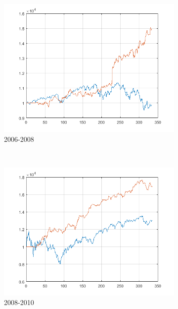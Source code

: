 \documentclass[11pt,a4,twosided,singlespacing,titlepagenumber=on]{scrreprt}
\numberwithin{equation}{chapter} %
\theoremstyle{remark}
\begin{document}
\begin{figure}[H]
\begin{subfigure}[t]{0.32\textwidth}
        \includegraphics[width=1\textwidth]{res/backtest/9}
        \caption{2006-2008}
    \end{subfigure} \\
    \begin{subfigure}[t]{0.32\textwidth}
        \centering
        \includegraphics[width=1\textwidth]{res/backtest/10}
        \caption{2008-2010}
    \end{subfigure}
    \begin{subfigure}[t]{0.32\textwidth}
        \centering

\end{subfigure}
\end{figure}
\end{document}
